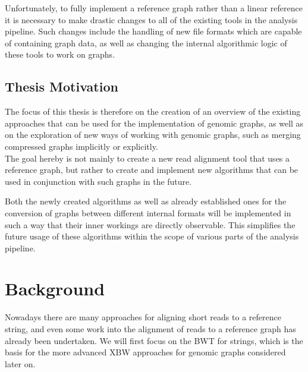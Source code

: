 \documentclass[a4paper,12pt,twoside,BCOR=10mm]{scrbook}
\begin{document}
Unfortunately, to fully implement a reference graph rather than a linear reference 
it is necessary to make drastic changes to all of the existing tools in the analysis pipeline. 
Such changes include the handling of new file formats which are capable of containing graph data, 
as well as changing the internal algorithmic logic of these tools to work on graphs.

\section{Thesis Motivation}

The focus of this thesis is therefore on the creation of an overview of the existing 
approaches that can be used for the implementation of genomic graphs, 
as well as on the exploration of new ways of working with genomic graphs, 
such as merging compressed graphs implicitly or explicitly. \\
The goal hereby is not mainly to create a new read alignment tool that uses 
a reference graph, but rather to create and implement new algorithms that can 
be used in conjunction with such graphs in the future.

Both the newly created algorithms as well as already established ones 
for the conversion of graphs between different internal formats 
will be implemented in such a way that their inner workings 
are directly observable. This simplifies the future usage of these algorithms 
within the scope of various parts of the analysis pipeline.

\chapter{Background}
%

Nowadays there are many approaches for aligning short reads to a reference string, 
and even some work into the alignment of reads to a reference graph has already been 
undertaken. 
We will first focus on the BWT for strings, which is the basis for the more advanced 
XBW approaches for genomic graphs considered later on.
\end{document}
